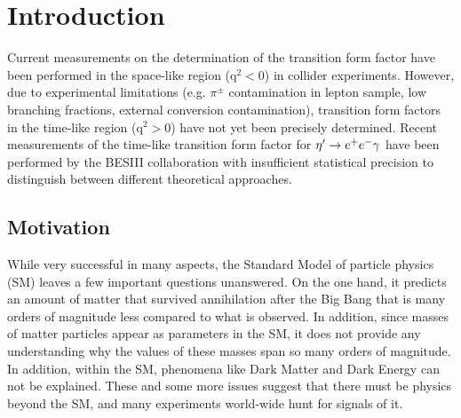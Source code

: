 \section{Introduction}
\indent Current measurements on the determination of the transition form factor have been performed in the space-like region ($\mathrm{q}^2<0$) in collider experiments. However, due to experimental limitations (e.g. $\pi^{\pm}$ contamination in lepton sample, low branching fractions, external conversion contamination), transition form factors in the time-like region ($\mathrm{q}^2>0$) have not yet been precisely determined. Recent measurements of the time-like transition form factor for $\eta^{\prime} \to e^+e^- \gamma$ have been performed by the BESIII collaboration with insufficient statistical precision to distinguish between different theoretical approaches. 
\subsection{Motivation}
While very successful in many aspects, the Standard Model of particle physics (SM)
leaves a few important questions unanswered. On the one hand, it predicts
an amount of matter that survived annihilation after the Big Bang that is many orders
of magnitude less compared to what is observed. In addition, since masses
of matter particles appear as parameters in the SM, it does not provide any understanding
why the values of these masses span so many orders of magnitude.
In addition, within the SM, phenomena like Dark Matter and Dark Energy can not be explained.
These and some more 
issues suggest that there must be physics beyond the SM, and many experiments
world-wide hunt for signals of it. 

